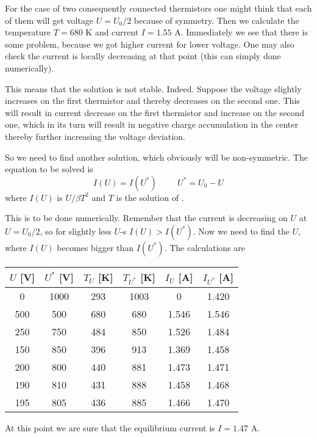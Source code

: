 For the case of two consequently connected thermistors
one might think that each of them will get voltage $U = U_0 / 2$
because of symmetry.
Then we calculate the temperature $T = 680 \text{ K}$ and
current $I = 1.55 \text{ A}$.
Immediately we see that there is some problem,
because we got higher current for lower voltage.
One may also check the current is locally decreasing at that point
(this can simply done numerically).

This means that the solution is not stable. Indeed.
Suppose the voltage slightly increases on the first thermistor
and thereby decreases on the second one.
This will result in current decrease on the first thermistor
and increase on the second one,
which in its turn will result in negative charge accumulation in the center
thereby further increasing the voltage deviation.

So we need to find another solution,
which obviously will be non-symmetric.
The equation to be solved is
\begin{equation}
    I(U) = I(U^*) \hspace{1cm} U^* = U_0 - U
\end{equation}
where $I(U)$ is $U / \beta T^2$ and $T$ is the solution of .

This is to be done numerically.
Remember that the current is decreasing on $U$ at $U = U_0 / 2$,
so for slightly less $U$-s $I(U) > I(U^*)$.
Now we need to find the $U$, where $I(U)$ becomes bigger than $I(U^*)$.
The calculations are
\begin{center}
    \begin{tabular}{ c | c | c | c | c | c}
    $U$ [V]  & $U^*$ [V] & $T_U$ [K] & $T_{U^*}$ [K] & $I_U$ [A] & $I_{U^*}$ [A] \\
    \hline
    0     & 1000 & 293 & 1003 & 0     & 1.420 \\
    500   & 500  & 680 & 680  & 1.546 & 1.546 \\
    250   & 750  & 484 & 850  & 1.526 & 1.484 \\
    150   & 850  & 396 & 913  & 1.369 & 1.458 \\
    \rowcolor{yellow}
    200   & 800  & 440 & 881  & 1.473 & 1.471 \\
    190   & 810  & 431 & 888  & 1.458 & 1.468 \\
    \rowcolor{yellow}
    195   & 805  & 436 & 885  & 1.466 & 1.470 \\
    \end{tabular}
\end{center}
At this point we are sure that the equilibrium current is $I = 1.47 \text{ A}$.
